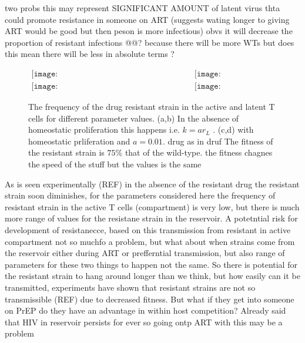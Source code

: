 \documentclass[DIV=15]{scrartcl}
\begin{document}
two  probs this may represent  SIGNIFICANT AMOUNT 	of latent virus thta could promote resistance in someone on ART (suggests wating longer to giving ART would be good but then peson is  more  infectious) obvs it will  decrease the proportion of resistant infections @@? because there will be more  WTs  but does  this mean there will be less in absolute terms ?




\begin{figure*}[h]
 \begin{center}$
 \begin{array}{cc}
 \texttt{[image: NoHomeo\_Active\_S1\_HigFit075\_09\_06b.png]} &
 \texttt{[image: NoHomeo\_Reservoir\_S1\_HigFit075\_09\_06b.png]} \\
  \texttt{[image: Homeo\_Active\_S1\_HigFit075\_09\_06b.png]} &
 \texttt{[image: Homeo\_Reservoir\_S1\_HigFit075\_09\_06b.png]}
 \end{array}$
 \end{center}
 \caption{The frequency of the drug resistant strain in the active and latent T cells for different parameter values. (a,b) In the absence of homeostatic proliferation this happens i.e. $k = ar_L$ . (c,d) with homeostatic prliferation and $a = 0.01$.  drug as in druf 
 The fitness of the resistant strain is $75\%$ that of the wild-type. the fitness chagnes  the speed  of the stuff but the values is the same  }
 \label{within host parameter sweep}
 \end{figure*} 

As is seen experimentally (REF) in the absence of the resistant drug the resistant strain soon diminishes,  for the parameters considered here the frequency of resistant strain in the active T cells (compartment) is very low, but there is much more range of values for the resistane strain in the reservoir. A potetntial risk for development 
of resistanecce, based on this transmission from resistant in active compartment not so muchfo a problem,  but what about when strains come from the reservoir either during ART or prefferntial transmission, but also  range of parameters for these two things to happen not the same. So there is potential for the resistant strain to hang around longer than we think, but how easily can it be transmitted, experiments have shown that resistant strains are not so transmissible (REF) due to decreased fitness.  But what if they get into someone on PrEP do they have an advantage in within host competition? Already said that HIV in reservoir persists for ever so going ontp ART with this may be a problem
\end{document}
